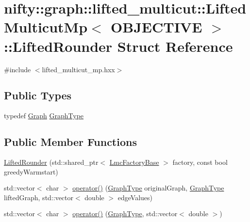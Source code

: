 \hypertarget{structnifty_1_1graph_1_1lifted__multicut_1_1LiftedMulticutMp_1_1LiftedRounder}{}\section{nifty\+:\+:graph\+:\+:lifted\+\_\+multicut\+:\+:Lifted\+Multicut\+Mp$<$ O\+B\+J\+E\+C\+T\+I\+V\+E $>$\+:\+:Lifted\+Rounder Struct Reference}
\label{structnifty_1_1graph_1_1lifted__multicut_1_1LiftedMulticutMp_1_1LiftedRounder}


{\ttfamily \#include $<$lifted\+\_\+multicut\+\_\+mp.\+hxx$>$}

\subsection*{Public Types}
\begin{DoxyCompactItemize}
\item 
typedef \hyperlink{classnifty_1_1graph_1_1lifted__multicut_1_1LiftedMulticutMp_acafc07ce6f89254b32d9ca4872d6de15}{Graph} \hyperlink{structnifty_1_1graph_1_1lifted__multicut_1_1LiftedMulticutMp_1_1LiftedRounder_ae4a417e62ddc95fa7419a8a8ff402fb3}{Graph\+Type}
\end{DoxyCompactItemize}
\subsection*{Public Member Functions}
\begin{DoxyCompactItemize}
\item 
\hyperlink{structnifty_1_1graph_1_1lifted__multicut_1_1LiftedMulticutMp_1_1LiftedRounder_a4ff3eae544db7eb0c24adc99f4a00ba8}{Lifted\+Rounder} (std\+::shared\+\_\+ptr$<$ \hyperlink{classnifty_1_1graph_1_1lifted__multicut_1_1LiftedMulticutMp_af71b591afe9d847b241acab738c740c4}{Lmc\+Factory\+Base} $>$ factory, const bool greedy\+Warmstart)
\item 
std\+::vector$<$ char $>$ \hyperlink{structnifty_1_1graph_1_1lifted__multicut_1_1LiftedMulticutMp_1_1LiftedRounder_a9194f2b24a5f44df08bd6f62c0a93eea}{operator()} (\hyperlink{structnifty_1_1graph_1_1lifted__multicut_1_1LiftedMulticutMp_1_1LiftedRounder_ae4a417e62ddc95fa7419a8a8ff402fb3}{Graph\+Type} original\+Graph, \hyperlink{structnifty_1_1graph_1_1lifted__multicut_1_1LiftedMulticutMp_1_1LiftedRounder_ae4a417e62ddc95fa7419a8a8ff402fb3}{Graph\+Type} lifted\+Graph, std\+::vector$<$ double $>$ edge\+Values)
\item 
std\+::vector$<$ char $>$ \hyperlink{structnifty_1_1graph_1_1lifted__multicut_1_1LiftedMulticutMp_1_1LiftedRounder_a5fb56228fa615a6f887790711673f764}{operator()} (\hyperlink{structnifty_1_1graph_1_1lifted__multicut_1_1LiftedMulticutMp_1_1LiftedRounder_ae4a417e62ddc95fa7419a8a8ff402fb3}{Graph\+Type}, std\+::vector$<$ double $>$)
\end{DoxyCompactItemize}

